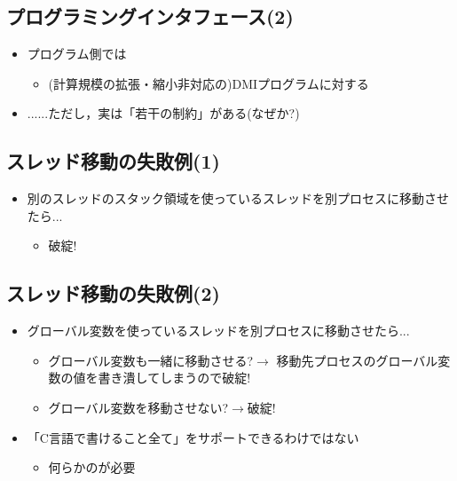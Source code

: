 \documentclass[25pt,papersize,landscape]{jsarticle}
\begin{document}
\subsection{プログラミングインタフェース(2)}

\begin{itemize}
\item プログラム側では
  \begin{itemize}
  \item (計算規模の拡張・縮小非対応の)DMIプログラムに対する
  \end{itemize}
\item ......ただし，実は「若干の制約」がある(なぜか?)
\end{itemize}

\subsection{スレッド移動の失敗例(1)}

\begin{itemize}
\item 別のスレッドのスタック領域を使っているスレッドを別プロセスに移動させたら...
  \begin{itemize}
  \item 破綻!
  \end{itemize}
\end{itemize}


\subsection{スレッド移動の失敗例(2)}

\begin{itemize}
\item グローバル変数を使っているスレッドを別プロセスに移動させたら...
  \begin{itemize}
  \item グローバル変数も一緒に移動させる?$\to$
    移動先プロセスのグローバル変数の値を書き潰してしまうので破綻!
  \item グローバル変数を移動させない?$\to$破綻!
  \end{itemize}
\end{itemize}
\begin{itemize}
\item 「C言語で書けること全て」をサポートできるわけではない
  \begin{itemize}
  \item 何らかのが必要
  \end{itemize}
\end{itemize}
\end{document}
